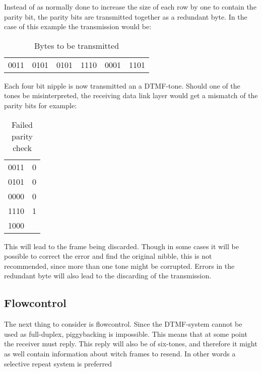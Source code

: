 Instead of as normally done to increase the size of each row by one to contain
the parity bit, the parity bits are transmitted together as a redundant byte. In
the case of this example the transmission would be:

\begin{table}[htb]
	\begin{center}
	\begin{tabular}{c|c|c|c|c|c}
	0011 & 0101 & 0101 & 1110 & 0001 & 1101 \\
	\end{tabular}
	\end{center}
	\caption{Bytes to be transmitted}
	\label{tab:Bytes_to_be_transmitted}
\end{table}

Each four bit nipple is now transmitted an a DTMF-tone. Should one of the tones
be misinterpreted, the receiving data link layer would get a mismatch of the
parity bits for example:

\begin{table}[htb]
	\begin{center}
	\begin{tabular}{c|c}
	0011 & 0 \\
	0101 & 0 \\
	0000 & 0 \\
	1110 & 1 \\
	\hline
	1000 & \\
	\end{tabular}
	\end{center}
	\caption{Failed parity check}
	\label{tab:Failed_parity_check}
\end{table}

This will lead to the frame being discarded. Though in some cases it will be
possible to correct the error and find the original nibble, this is not
recommended, since more than one tone might be corrupted. Errors in the
redundant byte will also lead to the discarding of the transmission.

\subsection{Flowcontrol}
The next thing to consider is flowcontrol. Since the DTMF-system
cannot be used as full-duplex, piggybacking is impossible. This means that at
some point the receiver must reply. This reply will also be of six-tones, and
therefore it might as well contain information about witch frames to resend. In
other words a selective repeat system is preferred

